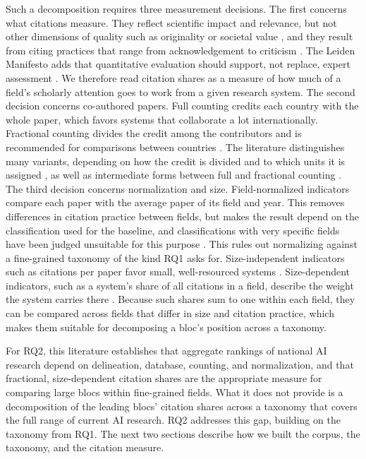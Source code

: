 \documentclass[10pt,twocolumn,a4paper]{article}
\begin{document}
	Such a decomposition requires three measurement decisions. The first concerns what citations measure. They reflect scientific impact and relevance, but not other dimensions of quality such as originality or societal value \parencite{aksnes2019citations}, and they result from citing practices that range from acknowledgement to criticism \parencite{bornmann2008what}. The Leiden Manifesto adds that quantitative evaluation should support, not replace, expert assessment \parencite{hicks2015bibliometrics}. We therefore read citation shares as a measure of how much of a field's scholarly attention goes to work from a given research system. The second decision concerns co-authored papers. Full counting credits each country with the whole paper, which favors systems that collaborate a lot internationally. Fractional counting divides the credit among the contributors and is recommended for comparisons between countries \parencite{waltman2015field}. The literature distinguishes many variants, depending on how the credit is divided and to which units it is assigned \parencite{gauffriau2007publication}, as well as intermediate forms between full and fractional counting \parencite{sivertsen2019measuring}. The third decision concerns normalization and size. Field-normalized indicators compare each paper with the average paper of its field and year. This removes differences in citation practice between fields, but makes the result depend on the classification used for the baseline, and classifications with very specific fields have been judged unsuitable for this purpose \parencite{waltman2019field}. This rules out normalizing against a fine-grained taxonomy of the kind RQ1 asks for. Size-independent indicators such as citations per paper favor small, well-resourced systems \parencite{almarzouqi2024comparative}. Size-dependent indicators, such as a system's share of all citations in a field, describe the weight the system carries there \parencite{waltman2016review}. Because such shares sum to one within each field, they can be compared across fields that differ in size and citation practice, which makes them suitable for decomposing a bloc's position across a taxonomy.
	
	For RQ2, this literature establishes that aggregate rankings of national AI research depend on delineation, database, counting, and normalization, and that fractional, size-dependent citation shares are the appropriate measure for comparing large blocs within fine-grained fields. What it does not provide is a decomposition of the leading blocs' citation shares across a taxonomy that covers the full range of current AI research. RQ2 addresses this gap, building on the taxonomy from RQ1. The next two sections describe how we built the corpus, the taxonomy, and the citation measure.
	
\end{document}

